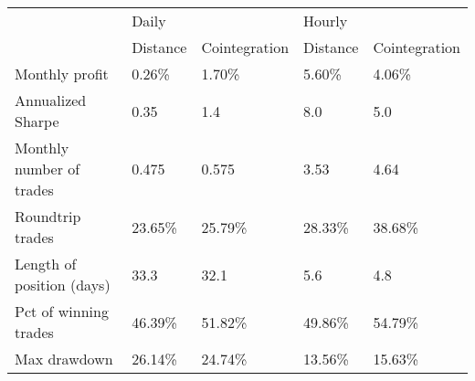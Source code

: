 \begin{tabular}{lllll}
\toprule
{} & \multicolumn{2}{l}{Daily} & \multicolumn{2}{l}{Hourly} \\
{} & Distance & Cointegration & Distance & Cointegration \\
\midrule
Monthly profit            &   0.26\% &        1.70\% &   5.60\% &        4.06\% \\
Annualized Sharpe         &     0.35 &           1.4 &      8.0 &           5.0 \\
Monthly number of trades  &    0.475 &         0.575 &     3.53 &          4.64 \\
Roundtrip trades          &  23.65\% &       25.79\% &  28.33\% &       38.68\% \\
Length of position (days) &     33.3 &          32.1 &      5.6 &           4.8 \\
Pct of winning trades     &  46.39\% &       51.82\% &  49.86\% &       54.79\% \\
Max drawdown              &  26.14\% &       24.74\% &  13.56\% &       15.63\% \\
\bottomrule
\end{tabular}
